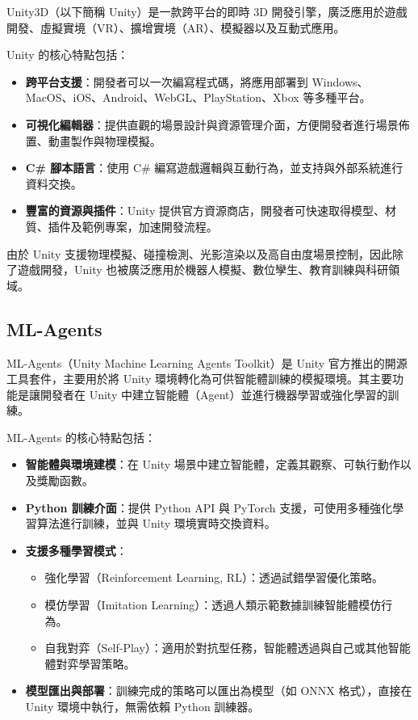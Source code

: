 \documentclass[12pt,a4paper]{article}
\begin{document}
Unity3D（以下簡稱 Unity）是一款跨平台的即時 3D 開發引擎，廣泛應用於遊戲開發、虛擬實境（VR）、擴增實境（AR）、模擬器以及互動式應用。

Unity 的核心特點包括：

\begin{itemize}
    \item \textbf{跨平台支援}：開發者可以一次編寫程式碼，將應用部署到 Windows、MacOS、iOS、Android、WebGL、PlayStation、Xbox 等多種平台。
    \item \textbf{可視化編輯器}：提供直觀的場景設計與資源管理介面，方便開發者進行場景佈置、動畫製作與物理模擬。
    \item \textbf{C\# 腳本語言}：使用 C\# 編寫遊戲邏輯與互動行為，並支持與外部系統進行資料交換。
    \item \textbf{豐富的資源與插件}：Unity 提供官方資源商店，開發者可快速取得模型、材質、插件及範例專案，加速開發流程。
\end{itemize}

由於 Unity 支援物理模擬、碰撞檢測、光影渲染以及高自由度場景控制，因此除了遊戲開發，Unity 也被廣泛應用於機器人模擬、數位孿生、教育訓練與科研領域。



\subsection{ML-Agents}
ML-Agents（Unity Machine Learning Agents Toolkit）是 Unity 官方推出的開源工具套件，主要用於將 Unity 環境轉化為可供智能體訓練的模擬環境。其主要功能是讓開發者在 Unity 中建立智能體（Agent）並進行機器學習或強化學習的訓練。
\\ \par
ML-Agents 的核心特點包括：

\begin{itemize}
	\item \textbf{智能體與環境建模}：在 Unity 場景中建立智能體，定義其觀察、可執行動作以及獎勵函數。
	
	\item \textbf{Python 訓練介面}：提供 Python API 與 PyTorch 支援，可使用多種強化學習算法進行訓練，並與 Unity 環境實時交換資料。
	
	\item \textbf{支援多種學習模式}：
	
	\begin{itemize}
	\item 強化學習（Reinforcement Learning, RL）：透過試錯學習優化策略。
	
	\item 模仿學習（Imitation Learning）：透過人類示範數據訓練智能體模仿行為。
	
	\item 自我對弈（Self-Play）：適用於對抗型任務，智能體透過與自己或其他智能體對弈學習策略。
	\end{itemize}	

	\item \textbf{模型匯出與部署}：訓練完成的策略可以匯出為模型（如 ONNX 格式），直接在 Unity 環境中執行，無需依賴 Python 訓練器。
\end{itemize}
\end{document}
